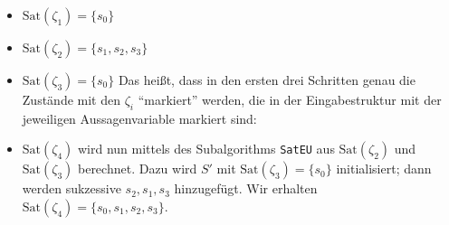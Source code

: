 \documentclass[fontsize=11pt, twoside=false, numbers=autoenddot]{scrbook}
\begin{document}
\begin{itemize}
  \item
    $\text{Sat}(\zeta_1) = \{s_0\}$
  \item
    $\text{Sat}(\zeta_2) = \{s_1,s_2,s_3\}$
  \item
    $\text{Sat}(\zeta_3) = \{s_0\}$
    \parI
    Das heißt, dass in den ersten drei Schritten genau die Zustände mit den $\zeta_i$ "`markiert"' werden,
    die in der Eingabestruktur \Smc mit der
    jeweiligen Aussagenvariable markiert sind:
    \begin{center}
    \end{center}
  \item
    $\text{Sat}(\zeta_4)$ wird nun mittels des Subalgorithms \texttt{SatEU} aus 
    $\text{Sat}(\zeta_2)$ und $\text{Sat}(\zeta_3)$ berechnet.
    Dazu wird $S'$ mit $\text{Sat}(\zeta_3)=\{s_0\}$ initialisiert;
    dann werden sukzessive $s_2, s_1, s_3$ hinzugefügt.
    Wir erhalten $\text{Sat}(\zeta_4) = \{s_0,s_1,s_2,s_3\}$.
    

\end{itemize}
\end{document}
